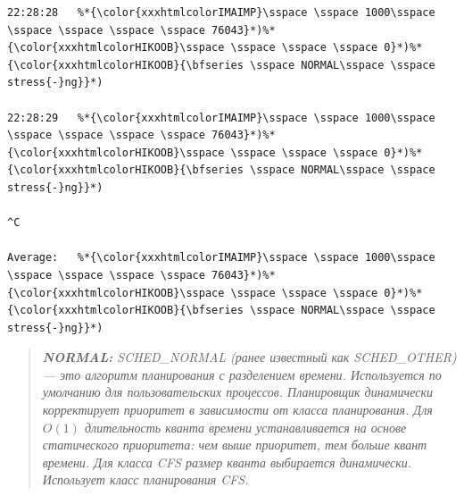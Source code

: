 \documentclass[12pt,onecolumn]{article}
\newcommand{\sspace}{\hspace{8pt}}
\begin{document}
{\begin{lstlisting}
22:28:28   %*{\color{xxxhtmlcolorIMAIMP}\sspace \sspace 1000\sspace \sspace \sspace \sspace \sspace 76043}*)%*{\color{xxxhtmlcolorHIKOOB}\sspace \sspace \sspace \sspace 0}*)%*{\color{xxxhtmlcolorHIKOOB}{\bfseries \sspace NORMAL\sspace \sspace stress{-}ng}}*)

22:28:29   %*{\color{xxxhtmlcolorIMAIMP}\sspace \sspace 1000\sspace \sspace \sspace \sspace \sspace 76043}*)%*{\color{xxxhtmlcolorHIKOOB}\sspace \sspace \sspace \sspace 0}*)%*{\color{xxxhtmlcolorHIKOOB}{\bfseries \sspace NORMAL\sspace \sspace stress{-}ng}}*)

^C

Average:   %*{\color{xxxhtmlcolorIMAIMP}\sspace \sspace 1000\sspace \sspace \sspace \sspace \sspace 76043}*)%*{\color{xxxhtmlcolorHIKOOB}\sspace \sspace \sspace \sspace 0}*)%*{\color{xxxhtmlcolorHIKOOB}{\bfseries \sspace NORMAL\sspace \sspace stress{-}ng}}*)
\end{lstlisting}}
\begin{quote}
  \textit{
  \textbf{NORMAL:} SCHED\_NORMAL (ранее известный как SCHED\_OTHER) — это алгоритм планирования с разделением времени. Используется по умолчанию для пользовательских процессов. Планировщик динамически корректирует приоритет в зависимости от класса планирования. Для $O(1)$ длительность кванта времени устанавливается на основе статического приоритета: чем выше приоритет, тем больше квант времени. Для класса CFS размер кванта выбирается динамически. Использует класс планирования CFS.
  }
\end{quote}
\end{document}
